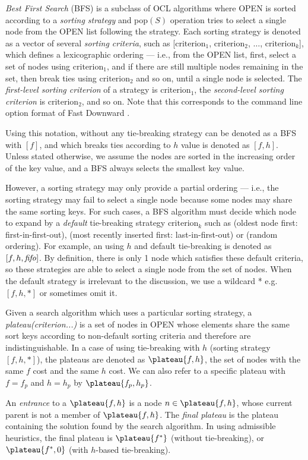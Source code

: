 \emph{Best First Search} (BFS) is a subclass of OCL algorithms where OPEN is sorted according to a \emph{sorting strategy} and pop$(S)$ operation tries to select a single node from the OPEN list following the strategy.
Each sorting strategy is denoted as a vector of several \emph{sorting criteria}, such as
[$\text{criterion}_1$, $\text{criterion}_2$, $\ldots$,
$\text{criterion}_k$], which defines a lexicographic ordering ---
i.e., from the OPEN list, first, select a
set of nodes using $\text{criterion}_1$, and if there are still multiple
nodes remaining in the set, then break ties using $\text{criterion}_2$
and so on, until a single node is selected.  The \emph{first-level
sorting criterion} of a strategy is $\text{criterion}_1$, the
\emph{second-level sorting criterion} is $\text{criterion}_2$, and so on.
Note that this corresponds to the command line option format of Fast
Downward \cite{Helmert2006}.

Using this notation, \astar without any tie-breaking strategy can be
denoted as a BFS with $[f]$, and \astar which breaks ties according to $h$
value is denoted as $[f,h]$.
Unless stated otherwise, we assume the nodes are sorted in the
increasing order of the key value, and a BFS always selects the smallest
key value.

However, a sorting strategy may only provide a partial ordering ---
i.e., the sorting strategy may fail to select a single node because some nodes
may share the same sorting keys.
For such cases, a BFS algorithm must
decide which node to expand by a \emph{default} tie-breaking
strategy $\text{criterion}_k$ such as  \fifo (oldest node first: first-in-first-out), \lifo
(most recently inserted first: last-in-first-out) or \ro (random ordering).
For example, an \astar using $h$ and \fifo default tie-breaking is denoted as $[f,h,{\text{\textit{fifo}}}]$.
By definition, there is only 1 node which satisfies these default criteria, so these
strategies are able to select a single node from the set of nodes.
When the default strategy is irrelevant to the discussion,
we use a wildcard * e.g. $[f,h,*]$ or sometimes omit it.

Given a search algorithm which uses a particular sorting strategy, 
a \emph{plateau(criterion...)} is a set of nodes in OPEN whose elements share
the same sort keys according to non-default sorting criteria and therefore
are indistinguishable. In a case of \astar
using tie-breaking with $h$ (sorting strategy $[f,h,*]$), the plateaus are denoted as
$\plateau{f,h}$, the set of nodes with the same $f$ cost and the same $h$ cost.
We can also refer to a specific plateau with $f=f_p$ and $h=h_p$ by $\plateau{f_p,h_p}$.

An \emph{entrance} to a $\plateau{f,h}$ is a node $n \in
\plateau{f,h}$, whose current parent is not a member of
$\plateau{f,h}$.  The \emph{final plateau} is the plateau
containing the solution found by the search algorithm.  In \astar using
admissible heuristics, the final plateau is $\plateau{f^*}$ (without
tie-breaking), or $\plateau{f^*,0}$ (with $h$-based tie-breaking).
